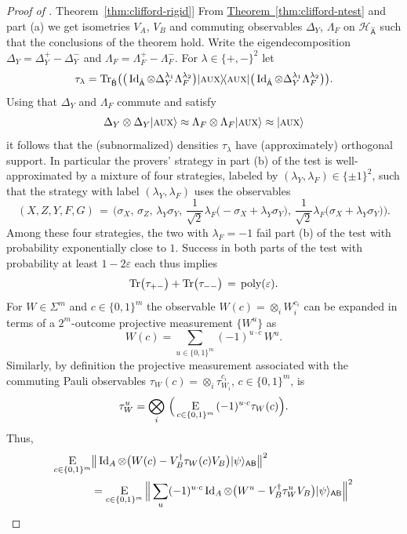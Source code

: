 \documentclass[11pt]{article}
\numberwithin{equation}{section}
\theoremstyle{definition}
\theoremstyle{plain}
\newcommand{\expref}[2]{\hyperref[#2]{#1~\ref{#2}}}
\newcommand{\ket}[1]{|#1\rangle}
\newcommand{\bra}[1]{\langle#1|}
\newcommand{\proj}[1]{\ket{#1}\!\bra{#1}}
\newcommand{\Tr}{\mbox{\rm Tr}}
\newcommand{\Id}{\ensuremath{\mathop{\rm Id}\nolimits}}
\newcommand{\Es}[1]{\ensuremath{\mathop{\textsc{E}}}_{#1}} %
\DeclareMathOperator{\poly}{poly}
\newcommand{\reg}[1]{{\textsf{#1}}}
\newcommand{\mH}{\mathcal{H}}
\newcommand{\eps}{\varepsilon}
\newcommand{\aux}{\textsc {aux}}
\newcommand{\phase}{\Lambda}
\begin{document}
\begin{proof}[Proof of \expref{Theorem}{thm:clifford-rigid}]
From \expref{Theorem}{thm:clifford-ntest} and part (a) we get isometries $V_A$, $V_B$ and commuting observables $\Delta_Y$, $\phase_F$ on ${\mH}_{\hat{\reg{A}}}$ such that the conclusions of the theorem hold. Write the eigendecomposition $\Delta_Y = \Delta_Y^{+}-\Delta_Y^{-}$ and $\phase_F = \phase_F^{+}-\phase_F^{-}$. For $\lambda \in \{+,-\}^2$ let
$$\tau_{\lambda} = \Tr_{\hat{\reg{B}}}\big( \big(\Id_{\hat{\reg{A}}}\otimes \Delta_Y^{\lambda_1}\phase_F^{\lambda_2} \big)\proj{\aux}\big(\Id_{\hat{\reg{A}}}\otimes \Delta_Y^{\lambda_1}\phase_F^{\lambda_2}\big)\big).$$ 
Using that $\Delta_Y$ and $\phase_F$ commute and satisfy 
$$\Delta_Y \otimes \Delta_Y \ket{\aux} \approx \phase_F\otimes \phase_F \ket{\aux} \approx \ket{\aux}$$
 it follows that the (subnormalized) densities $\tau_{\lambda}$ have (approximately) orthogonal support. In particular the provers' strategy in part (b) of the test is well-approximated by a mixture of four strategies, labeled by $(\lambda_Y,\lambda_F)\in\{\pm 1\}^2$, such that the strategy with label $(\lambda_Y,\lambda_F)$ uses the observables 
$$(X,Z,Y,F,G)\,=\,\Big(\sigma_X,\,\sigma_Z,\,\lambda_Y\sigma_Y,\,\frac{1}{\sqrt{2}}\lambda_F\big(-\sigma_X + \lambda_Y\sigma_Y\big),\,\frac{1}{\sqrt{2}}\lambda_F\big(\sigma_X + \lambda_Y\sigma_Y\big)\Big).$$ 
Among these four strategies, the two with $\lambda_F=-1$ fail part (b) of the test with probability exponentially close to $1$. Success in both parts of the test with probability at least $1-2\eps$ each thus implies
\begin{equation}\label{eq:tau-bound}
\Tr\big(\tau_{+-}\big)+\Tr\big(\tau_{--}\big) \,=\, \poly(\eps).
\end{equation} 
For $W\in \Sigma^{m}$ and $c\in \{0,1\}^m$ the observable $W(c) = \otimes_i W_{i}^{c_i}$ can be expanded in terms of a $2^m$-outcome projective measurement $\{W^{u}\}$ as 
$$W(c) = \sum_{u\in \{0,1\}^m}  (-1)^{u\cdot c} \,W^{u}.$$
Similarly, by definition the projective measurement associated with the commuting Pauli observables $\tau_W(c) = \otimes_i \tau_{W_{i}}^{c_i}$, $c\in\{0,1\}^m$, is 
$$\tau_W^{u} = \bigotimes_i \,\Big(\Es{c\in \{0,1\}^m} \,(-1)^{u \cdot c} \tau_W(c)\Big).$$ 
Thus,
\begin{align}
\Es{c\in\{0,1\}^m} & \big\| \Id_A \otimes \big(  W(c) - V_B^\dagger \tau_{W}(c) V_B\big)   \ket{\psi}_{\reg{AB}} \big\|^2\notag\\
&= \Es{c\in\{0,1\}^m}\Big\| \sum_{u} (-1)^{u\cdot c} \Id_A \otimes \big(  W^{u} - V_B^\dagger\tau_{W}^{u} V_B\big)   \ket{\psi}_{\reg{AB}} \Big\|^2    \notag\\

\end{align}
\end{proof}
\end{document}
